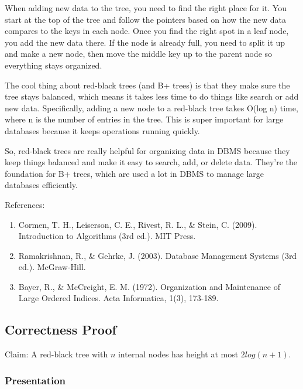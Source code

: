 \documentclass[10pt]{article}
\begin{document}
  \spacing
  \noindent
  When adding new data to the tree, you need to find the right place for it. You
  start at the top of the tree and follow the pointers based on how the new data
  compares to the keys in each node. Once you find the right spot in a leaf node,
  you add the new data there. If the node is already full, you need to split it up
  and make a new node, then move the middle key up to the parent node so
  everything stays organized.

  \spacing
  \noindent
  The cool thing about red-black trees (and B+ trees) is that they make sure the
  tree stays balanced, which means it takes less time to do things like search
  or add new data. Specifically, adding a new node to a red-black tree takes O(log
  n) time, where n is the number of entries in the tree. This is super important
  for large databases because it keeps operations running quickly.

  \spacing
  \noindent
  So, red-black trees are really helpful for organizing data in DBMS because
  they keep things balanced and make it easy to search, add, or delete data. They're
  the foundation for B+ trees, which are used a lot in DBMS to manage large databases
  efficiently.

  \spacing
  \noindent
  References:

  \begin{enumerate}
    \item Cormen, T. H., Leiserson, C. E., Rivest, R. L., & Stein, C. (2009).
      Introduction to Algorithms (3rd ed.). MIT Press.

    \item Ramakrishnan, R., & Gehrke, J. (2003). Database Management Systems (3rd
      ed.). McGraw-Hill.

    \item Bayer, R., & McCreight, E. M. (1972). Organization and Maintenance of
      Large Ordered Indices. Acta Informatica, 1(3), 173-189.
  \end{enumerate}

  \subsection*{Correctness Proof}


  Claim: A red-black tree with $n$ internal nodes has
  height at most $2log(n + 1)$.

  \subsubsection*{Presentation}
\end{document}
